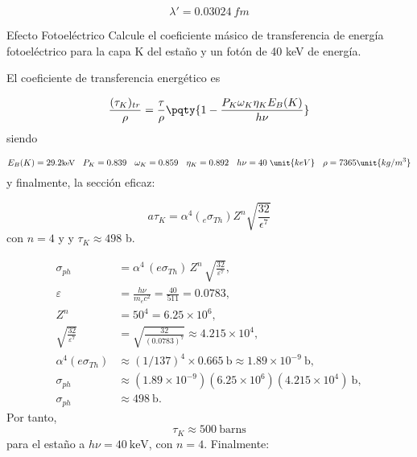 \begin{equation}
    \lambda' = 0.03024 \ \unit{fm}
\end{equation}


\begin{Ejercicio}{Efecto Fotoeléctrico}
    Calcule el coeficiente másico de transferencia de energía fotoeléctrico para la capa K del estaño y un fotón de 40 keV de energía.
\end{Ejercicio}

El coeficiente de transferencia energético es 

\begin{equation}
    \frac{(\tau_K)_{tr}}{\rho} = \frac{\tau}{\rho} \pqty{1-\frac{P_K\omega_K\eta_K E_B(K)}{h \nu}}
\end{equation}
siendo

\begin{equation} \small
    E_B (K) = 29.2 \text{keV} \quad  P_K = 0.839 \quad \omega_K = 0.859 \quad \eta_K =0.892 \quad h \nu = 40 \ \unit{keV} \quad \rho = 7365 \unit{kg/m^3}
\end{equation}
y finalmente, la sección eficaz: 

\begin{equation}
    a\tau_K = \alpha^4 (_e \sigma_{Th}) Z^n  \sqrt{\frac{32}{\epsilon^7}}
\end{equation}
con $n=4$ y y $\tau_K \approx 498$ b. 

\begin{align} 
    \sigma_{ph} &= \alpha^4 \, (e\sigma_{Th}) \, Z^n \, \sqrt{\frac{32}{\varepsilon^7}}, \\[1ex]
    \varepsilon &= \frac{h\nu}{m_e c^2} = \frac{40}{511} = 0.0783, \\[1ex]
    Z^n &= 50^4 = 6.25 \times 10^6, \\[1ex]
    \sqrt{\frac{32}{\varepsilon^7}} &= \sqrt{\frac{32}{(0.0783)^7}} \approx 4.215 \times 10^4, \\[1ex]
    \alpha^4 (e\sigma_{Th}) &\approx (1/137)^4 \times 0.665\ \text{b} 
    \approx 1.89 \times 10^{-9}\ \text{b}, \\[1ex]
    \sigma_{ph} &\approx (1.89 \times 10^{-9})(6.25 \times 10^6)(4.215 \times 10^4)\ \text{b}, \\[1ex]
    \sigma_{ph} &\approx 498\ \text{b}.
\end{align}
Por tanto,
\[
    {\tau_K \approx 500\ \text{barns}}
\]
para el estaño a \(h\nu = 40\ \text{keV}\), con \(n=4\). Finalmente: 

